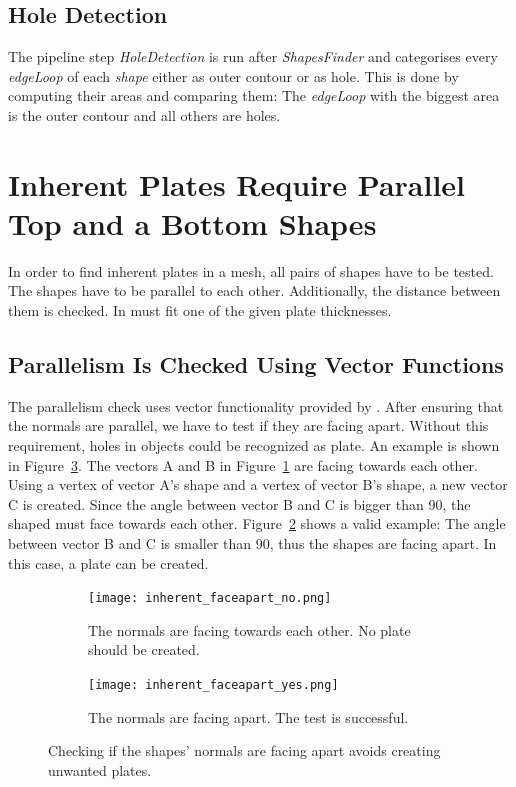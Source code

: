 \documentclass[../ClassicThesis.tex]{subfiles}
\begin{document}
\subsection{Hole Detection}\label{sub:holedetection}

The pipeline step \emph{HoleDetection} is run after \emph{ShapesFinder} and categorises every \emph{edgeLoop} of each \emph{shape} either as outer contour or as hole. This is done by computing their areas and comparing them: The \emph{edgeLoop} with the biggest area is the outer contour and all others are holes.



\section{Inherent Plates Require Parallel Top and a Bottom Shapes}\label{sec:inherentplates}

In order to find inherent plates in a mesh, all pairs of shapes have to be tested. The shapes have to be parallel to each other. Additionally, the distance between them is checked. In must fit one of the given plate thicknesses.

\subsection{Parallelism Is Checked Using Vector Functions}

The parallelism check uses vector functionality provided by \threejs{}. After ensuring that the normals are parallel, we have to test if they are facing apart. Without this requirement, holes in objects could be recognized as plate. An example is shown in Figure~\ref{fig:inherent_faceapart}. The vectors A and B in Figure~\ref{fig:inherent_faceapart:no} are facing towards each other. Using a vertex of vector A's shape and a vertex of vector B's shape, a new vector C is created. Since the angle between vector B and C is bigger than 90\textdegree{}, the shaped must face towards each other. Figure~\ref{fig:inherent_faceapart:yes} shows a valid example: The angle between vector B and C is smaller than 90\textdegree{}, thus the shapes are facing apart. In this case, a plate can be created.

\begin{figure}
  \centering
  \begin{subfigure}[t]{0.49\textwidth}
    \centering
    \texttt{[image: inherent\_faceapart\_no.png]}
    \caption{The normals are facing towards each other. No plate should be created.}
    \label{fig:inherent_faceapart:no}
  \end{subfigure}
  \begin{subfigure}[t]{0.49\textwidth}
    \centering
    \texttt{[image: inherent\_faceapart\_yes.png]}
    \caption{The normals are facing apart. The test is successful.}
    \label{fig:inherent_faceapart:yes}
  \end{subfigure}
  \caption{Checking if the shapes' normals are facing apart avoids creating unwanted plates.}
  \label{fig:inherent_faceapart}
\end{figure}
\end{document}
